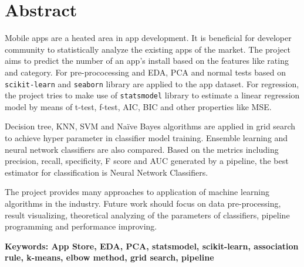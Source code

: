 \section{Abstract}

Mobile apps are a heated area in app development. It is beneficial for developer community to statistically analyze the existing apps of the market. The project aims to predict the number of an app's install based on the features like rating and category. For pre-prococessing and EDA, PCA and normal tests based on \texttt{scikit-learn} and \texttt{seaborn} library are applied to the app dataset.
For regression, the project tries to make use of \texttt{statsmodel} library to estimate a linear regression model by means of t-test, f-test, AIC, BIC and other properties like MSE. 

Decision tree, KNN, SVM and Na\"ive Bayes algorithms are applied in grid search to achieve hyper parameter in classifier model training. Ensemble learning and neural network classifiers are also compared. Based on the metrics including precision, recall, specificity, F score and AUC generated by a pipeline, the best estimator for classification is Neural Network Classifiers.

The project provides many approaches to application of machine learning algorithms in the industry. Future work should focus on data pre-processing, result visualizing, theoretical analyzing of the parameters of classifiers, pipeline programming and performance improving.

\newline
\textbf{Keywords: App Store, EDA, PCA, statsmodel, scikit-learn, association rule, k-means, elbow method, grid search, pipeline}